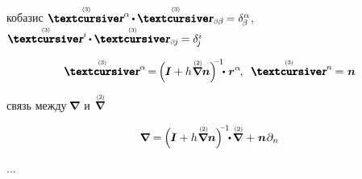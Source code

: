 \begin{otherlanguage}{russian}
кобазис
${\threedimensionallocationwithupperindex{\alpha} \hspace{-0.4ex} \dotp \hspace{-0.1ex} \threedimensionallocation_\differentialindex{\beta} \hspace{-0.2ex} = \delta^\alpha_{\hspace{-0.2ex}\beta}}$,
${\threedimensionallocationwithupperindex{i} \hspace{-0.4ex} \dotp \hspace{-0.1ex} \threedimensionallocation_\differentialindex{\hspace{-0.1ex}j} \hspace{-0.2ex} = \delta^{i}_{\hspace{-0.25ex}j}}$

\nopagebreak\vspace{-0.2em}\begin{equation*}
\threedimensionallocationwithupperindex{\alpha} \hspace{-0.5ex} = \hspace{-0.2ex} \Bigl( \hspace{-0.1ex}
\twoparameterunitdyad \hspace{.1ex}
+ h \hspace{.1ex} \boldnablaflat \unitnormalvector
\Bigr)^{\hspace{-0.6ex}\expminusone} \hspace{-0.9ex} \dotp \hspace{.1ex} \locationvector^\alpha
\hspace{-0.25ex} , \hspace{.5em}
\threedimensionallocationwithupperindex{n} \hspace{-0.33ex} = \hspace{.1ex} \unitnormalvector
\end{equation*}

связь между ${\hspace{-0.2ex}\bm{\nabla}\hspace{-0.2ex}}$ и~${\hspace{-0.2ex}\boldnablaflat}$

\nopagebreak\vspace{-0.2em}\begin{equation*}
\boldnabla = \hspace{-0.16ex} \Bigl( \hspace{-0.1ex}
\twoparameterunitdyad \hspace{.1ex}
+ h \hspace{.1ex} \boldnablaflat \unitnormalvector
\Bigr)^{\hspace{-0.6ex}\expminusone} \hspace{-0.9ex} \dotp \hspace{-0.2ex} \boldnablaflat \hspace{.2ex} + \hspace{.1ex} \unitnormalvector \hspace{.12ex} \partial_n
\end{equation*}

...

\end{otherlanguage}

